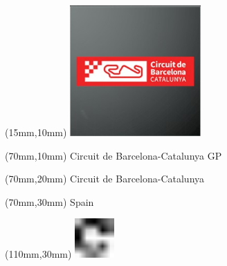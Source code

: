 \null\newpage
\begin{textblock*}{50mm}(15mm,10mm)%
\includegraphics[width=50mm]{LG/2015-05-20_00078.png}
\end{textblock*}
\begin{textblock*}{130mm}(70mm,10mm)%
{\fontsize{20}{20}\selectfont Circuit de Barcelona-Catalunya GP}\\
\end{textblock*}
\begin{textblock*}{120mm}(70mm,20mm)%
{\fontsize{16}{16}\selectfont Circuit de Barcelona-Catalunya}\\
\end{textblock*}
\begin{textblock*}{120mm}(70mm,30mm)%
{\fontsize{12}{12}\selectfont Spain}
\end{textblock*}
\begin{textblock*}{30mm}(110mm,30mm)%
\centering
\includegraphics[height=15mm]{icons/fa-rotate-right.pdf}
\end{textblock*}
